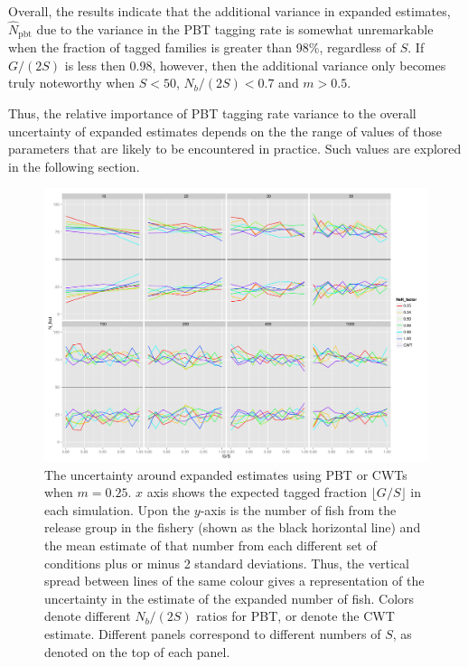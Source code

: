 \documentclass[11pt]{article}
\begin{document}
Overall, the results indicate that the additional variance in expanded estimates,
$\hat{N}_\mathrm{pbt}$ due to the variance in the PBT tagging rate is somewhat unremarkable 
when the fraction of tagged families is greater than 98\%, regardless of $S$.  If 
$G/(2S)$ is less then 0.98, however, then the additional variance only becomes truly 
noteworthy when $S<50$, $N_b/(2S) < 0.7$ and $m > 0.5$.

Thus, the relative importance of PBT tagging rate variance to the overall uncertainty of 
expanded estimates depends on the the range of values of those parameters that are
likely to be encountered in practice.  Such values are explored in the following section.

\begin{figure}
\includegraphics[width = .93\textwidth]{./images/sd_line_horns_m_0_25.pdf}
\caption{The uncertainty around expanded estimates using PBT or CWTs when $m = 0.25$.  $x$ axis shows the
expected tagged fraction $\lfloor G/S \rfloor$ in each simulation. Upon the $y$-axis is the number of fish from the
release group in the fishery (shown as the black horizontal line) and the mean estimate of that number from each different set of 
conditions plus or minus 2 standard deviations.  Thus, the vertical spread between lines of the same colour gives a representation
of the uncertainty in the estimate of the expanded number of fish. Colors denote different $N_b/(2S)$ ratios for PBT, or denote
the CWT estimate.  Different
panels correspond to different numbers of $S$, as denoted on the top of each panel.
\label{fig:horn0.125}}
\end{figure}
\end{document}
